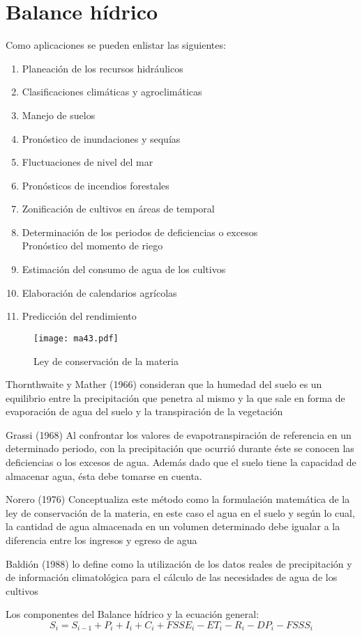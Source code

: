     \section{Balance hídrico}
    Como aplicaciones se pueden enlistar las siguientes:
    \begin{enumerate}
        \item Planeación de los recursos hidráulicos
        \item Clasificaciones climáticas y agroclimáticas
        \item Manejo de suelos
        \item Pronóstico de inundaciones y sequías
        \item Fluctuaciones de nivel del mar
        \item Pronósticos de incendios forestales
        \item Zonificación de cultivos en áreas de temporal
        \item Determinación de los periodos de deficiencias o excesos\\
     Pronóstico del momento de riego
        \item Estimación del consumo de agua de los cultivos
        \item Elaboración de calendarios agrícolas
        \item Predicción del rendimiento
    \end{enumerate}
    \begin{figure}[h!]
    \centering
      \texttt{[image: ma43.pdf]}
      \caption{Ley de conservación de la materia}
      \label{ma43}
    \end{figure}
    \begin{definition}
        Thornthwaite y Mather (1966) consideran que la humedad del suelo es un equilibrio entre la precipitación que penetra al mismo y la que sale en forma de evaporación de agua del suelo y la transpiración de la vegetación
    
    Grassi (1968) Al confrontar los valores de evapotranspiración de referencia en un determinado periodo, con la precipitación que ocurrió durante éste se conocen las deficiencias o los excesos de agua. Además dado que el suelo tiene la capacidad de almacenar agua, ésta debe tomarse en cuenta.
    
    Norero (1976) Conceptualiza este método como la formulación matemática de la ley de conservación de la materia, en este caso el agua en el suelo y según lo cual, la cantidad de agua almacenada en un volumen determinado debe igualar a la diferencia entre los ingresos y egreso de agua
    
    Baldión (1988) lo define como la utilización de los datos reales de precipitación y de información climatológica para el cálculo de las necesidades de agua de los cultivos
    \end{definition}
    Los componentes del Balance hídrico y la ecuación general:
    \begin{equation}
        S_i = S_{i - 1}+P_i+I_i+C_i+FSSE_i-ET_i-R_i-DP_i-FSSS_i
    \end{equation}
    
